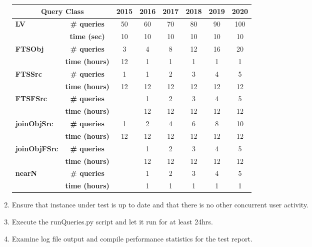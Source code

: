 \begin{enumerate}
{    \begin{tabular}{|l|c|c|c|c|c|c|c|}\hline
      \multicolumn{2}{|c|}{\textbf{Query Class}}
        &\textbf{2015}&\textbf{2016}&\textbf{2017}&\textbf{2018}&\textbf{2019}&\textbf{2020}\\\hline
      \multirow{2}{*}{\textbf{LV}}
        &\textbf{\# queries}  & 50 & 60 & 70 & 80 & 90 & 100 \\%
        &\textbf{time (sec)}  & 10 & 10 & 10 & 10 & 10 &  10 \\\hline
      \multirow{2}{*}{\textbf{FTSObj}}
        &\textbf{\# queries}  &  3 &  4 &  8 & 12 & 16 &  20 \\%
        &\textbf{time (hours)}& 12 &  1 &  1 &  1 &  1 &   1 \\\hline
      \multirow{2}{*}{\textbf{FTSSrc}}
        &\textbf{\# queries}  &  1 &  1 &  2 &  3 &  4 &   5 \\%
        &\textbf{time (hours)}& 12 & 12 & 12 & 12 & 12 &  12 \\\hline
      \multirow{2}{*}{\textbf{FTSFSrc}}
        &\textbf{\# queries}  &    &  1 &  2 &  3 &  4 &   5 \\%
        &\textbf{time (hours)}&    & 12 & 12 & 12 & 12 &  12 \\\hline
      \multirow{2}{*}{\textbf{joinObjSrc}}
        &\textbf{\# queries}  &  1 &  2 &  4 &  6 &  8 &  10 \\%
        &\textbf{time (hours)}& 12 & 12 & 12 & 12 & 12 &  12 \\\hline
      \multirow{2}{*}{\textbf{joinObjFSrc}}
        &\textbf{\# queries}  &    &  1 &  2 &  3 &  4 &   5 \\%
        &\textbf{time (hours)}&    & 12 & 12 & 12 & 12 &  12 \\\hline
      \multirow{2}{*}{\textbf{nearN}}
        &\textbf{\# queries}  &    &  1 &  2 &  3 &  4 &   5 \\%
        &\textbf{time (hours)}&    &  1 &  1 &  1 &  1 &   1 \\\hline
    \end{tabular}

  }

  \item{Ensure that \product{} instance under test is up to date and that there is no other concurrent
  user activity.}

  \item{Execute the runQueries.py script and let it run for at least 24hrs.}

  \item{Examine log file output and compile performance statistics for the test report.}

\end{enumerate}
